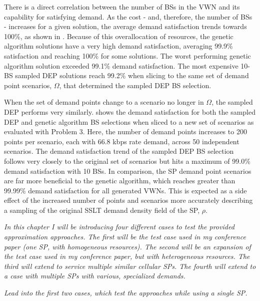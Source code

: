 \documentclass[12pt,dvipsnames]{report}
\begin{document}
There is a direct correlation between the number of BSs in the VWN and its capability for satisfying demand.  As the cost - and, therefore, the number of BSs - increases for a given solution, the average demand satisfaction trends towards 100\%, as shown in .  Because of this overallocation of resources, the genetic algorithm solutions have a very high demand satisfaction, averaging 99.9\% satisfaction and reaching 100\% for some solutions.  The worst performing genetic algorithm solution exceeded 99.1\% demand satisfaction.  The most expensive 10-BS sampled DEP solutions reach 99.2\% when slicing to the same set of demand point scenarios, $\Omega$, that determined the sampled DEP BS selection.

When the set of demand points change to a scenario no longer in $\Omega$, the sampled DEP performs very similarly.   shows the demand satisfaction for both the sampled DEP and genetic algorithm BS selections when sliced to a new set of scenarios as evaluated with Problem 3.  Here, the number of demand points increases to 200 points per scenario, each with 66.8 kbps rate demand, across 50 independent scenarios.  The demand satisfaction trend of the sampled DEP BS selection follows very closely to the original set of scenarios but hits a maximum of 99.0\% demand satisfaction with 10 BSs.  In comparison, the SP demand point scenarios are far more beneficial to the genetic algorithm, which reaches greater than 99.99\% demand satisfaction for all generated VWNs.  This is expected as a side effect of the increased number of points and scenarios more accurately describing a sampling of the original SSLT demand density field of the SP, $\rho$.

\textit{In this chapter I will be introducing four different cases to test the provided approximation approaches.  The first will be the test case used in my conference paper (one SP, with homogeneous resources).  The second will be an expansion of the test case used in my conference paper, but with heterogeneous resources.  The third will extend to service multiple similar cellular SPs.  The fourth will extend to a case with multiple SPs with various, specialized demands.}


\textit{Lead into the first two cases, which test the approaches while using a single SP.}
\end{document}
